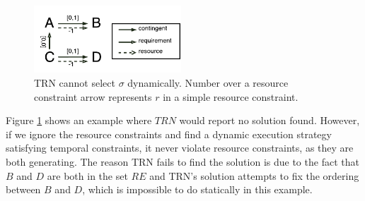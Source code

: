 \begin{figure}[H]
\begin{center}
\includegraphics[width=0.49\textwidth,trim={0.23cm 0.23cm 0.00cm 0.37cm},clip]{stnu_counter}
\caption{TRN cannot select $\sigma$ dynamically. Number over a resource constraint arrow represents $r$ in a simple resource constraint.}
\label{fig:stnu_counter}
\end{center}
\end{figure}

Figure \ref{fig:stnu_counter} shows an example where $TRN$ would report no solution found. However, if we ignore the resource constraints and find a dynamic execution strategy satisfying temporal constraints, it never violate resource constraints, as they are both generating. The reason TRN fails to find the solution is due to the fact that $B$ and $D$ are both in the set $RE$ and TRN's solution attempts to fix the ordering between $B$ and $D$, which is impossible to do statically in this example.


